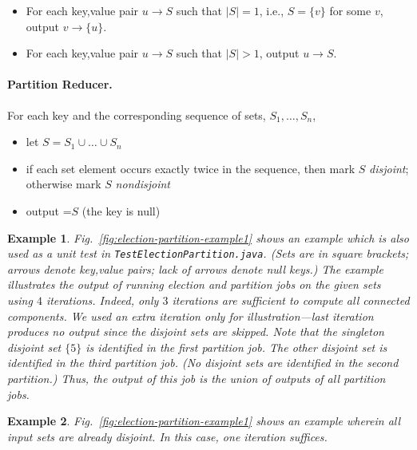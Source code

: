 \documentclass{article}[12pt]
\numberwithin{figure}{section}
\newtheorem{example}{Example}[section]
\begin{document}
\begin{itemize}
\item For each key,value pair $u \to S$ such that $|S| = 1$, i.e., $S=\{v\}$ for some $v$, output $v \to \{u\}$.

\item For each key,value pair $u \to S$ such that $|S| > 1$, output $u \to S$.
\end{itemize}

\paragraph{Partition Reducer.}

For each key and the corresponding sequence of sets, $S_1,\ldots,S_n$,
\begin{itemize}
\item let $S = S_1 \cup \ldots \cup S_n$
\item if each set element occurs exactly twice in the sequence, then mark $S$ \emph{disjoint}; otherwise mark $S$ \emph{nondisjoint}
\item output \VALUE=$S$  (the key is null)
\end{itemize}

\begin{example}
\rm

Fig.~\ref{fig:election-partition-example1} shows an example which is also used as a unit test in \texttt{TestElectionPartition.java}.
(Sets are in square brackets; arrows denote key,value pairs; lack of arrows denote null keys.)
The example illustrates the output of running election and partition jobs on the given sets using $4$ iterations.
Indeed, only $3$ iterations are sufficient to compute all connected components.  We used an extra iteration only for illustration---last iteration
produces no output since the disjoint sets are skipped.
Note that the singleton disjoint set $\{5\}$ is identified in the first partition job.  The other disjoint set is identified in the third partition
job.  (No disjoint sets are identified in the second partition.)  Thus, the output of this job is the union of outputs of all partition jobs.
\end{example}

\begin{example}
\rm

Fig.~\ref{fig:election-partition-example1} shows an example wherein all input sets are already disjoint.  In this case, one iteration suffices.
\end{example}
\end{document}
